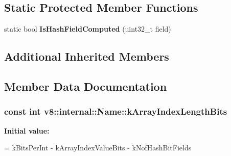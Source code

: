 \subsection*{Static Protected Member Functions}
\begin{DoxyCompactItemize}
\item 
\hypertarget{classv8_1_1internal_1_1_name_a9b9b29b11d96f3345cbee8f6e5b45465}{}static bool {\bfseries Is\+Hash\+Field\+Computed} (uint32\+\_\+t field)\label{classv8_1_1internal_1_1_name_a9b9b29b11d96f3345cbee8f6e5b45465}

\end{DoxyCompactItemize}
\subsection*{Additional Inherited Members}


\subsection{Member Data Documentation}
\hypertarget{classv8_1_1internal_1_1_name_a3fdf5618399447d88b8c9a8c2e89339e}{}
\subsubsection[{k\+Array\+Index\+Length\+Bits}]{\setlength{\rightskip}{0pt plus 5cm}const int v8\+::internal\+::\+Name\+::k\+Array\+Index\+Length\+Bits\hspace{0.3cm}{\ttfamily [static]}}\label{classv8_1_1internal_1_1_name_a3fdf5618399447d88b8c9a8c2e89339e}
{\bfseries Initial value\+:}
\begin{DoxyCode}
=
      kBitsPerInt - kArrayIndexValueBits - kNofHashBitFields
\end{DoxyCode}
\hypertarget{classv8_1_1internal_1_1_name_ae0af5213bf45a48b36de81433c7c31ad}{}
